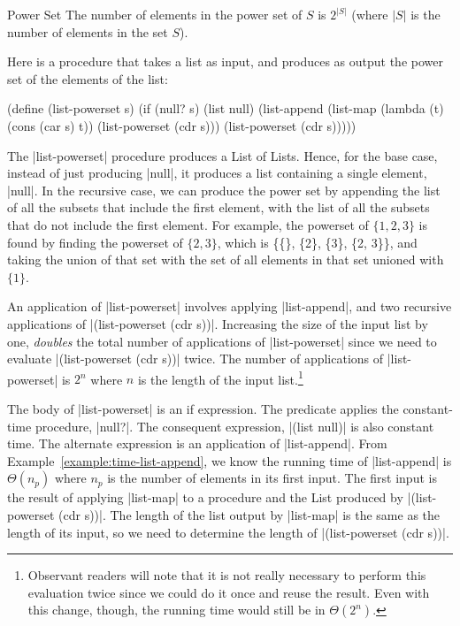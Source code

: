 \begin{schemeregion}
\begin{example}{Power Set}
The number of elements in the power set of $S$ is $2^{|S|}$ (where $|S|$ is the number of elements in the set $S$).  

Here is a procedure that takes a list as input, and produces as output the power set of the elements of the list:

\begin{schemedisplay}
(define (list-powerset s)
  (if (null? s) (list null)
      (list-append (list-map (lambda (t) (cons (car s) t)) 
                             (list-powerset (cdr s)))
                   (list-powerset (cdr s)))))
\end{schemedisplay}

The \scheme|list-powerset| procedure produces a List of Lists.  Hence, for the base case, instead of just producing \scheme|null|, it produces a list containing a single element, \scheme|null|.  In the recursive case, we can produce the power set by appending the list of all the subsets that include the first element, with the list of all the subsets that do not include the first element.  For example, the powerset of $\{1, 2, 3\}$ is found by finding the powerset of $\{2, 3\}$, which is \{\{\}, \{2\}, \{3\}, \{2, 3\}\}, and taking the union of that set with the set of all elements in that set unioned with $\{1\}$.  

An application of \scheme|list-powerset| involves applying \scheme|list-append|, and two recursive applications of \scheme|(list-powerset (cdr s))|.  Increasing the size of the input list by one, \emph{doubles} the total number of applications of \scheme|list-powerset| since we need to evaluate \scheme|(list-powerset (cdr s))| twice.  The number of applications of \scheme|list-powerset| is $2^n$ where $n$ is the length of the input list.\footnote{Observant readers will note that it is not really necessary to perform this evaluation twice since we could do it once and reuse the result.  Even with this change, though, the running time would still be in $\Theta(2^n)$.}

The body of \scheme|list-powerset| is an if expression.  The predicate applies the constant-time procedure, \scheme|null?|.  The consequent expression, \scheme|(list null)| is also constant time.  The alternate expression is an application of \scheme|list-append|.  From Example~\ref{example:time-list-append}, we know the running time of \scheme|list-append| is $\Theta(n_p)$ where $n_p$ is the number of elements in its first input.  The first input is the result of applying \scheme|list-map| to a procedure and the List produced by \scheme|(list-powerset (cdr s))|.  The length of the list output by \scheme|list-map| is the same as the length of its input, so we need to determine the length of \scheme|(list-powerset (cdr s))|.  


\end{example}
\end{schemeregion}
